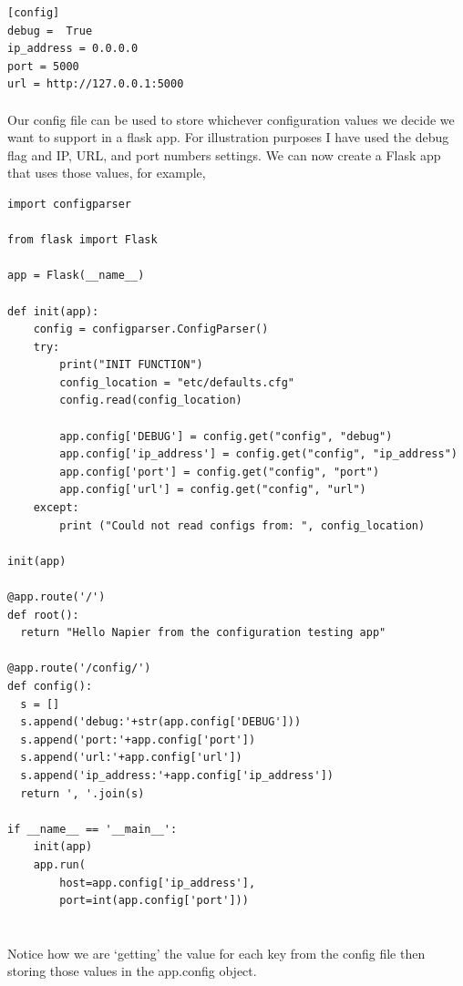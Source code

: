 \documentclass[12pt, a4paper, oneside]{book}
\begin{document}
{\begin{lstlisting}
[config]
debug =  True
ip_address = 0.0.0.0
port = 5000
url = http://127.0.0.1:5000
\end{lstlisting}

\paragraph{} Our config file can be used to store whichever configuration values we decide we want to support in a flask app. For illustration purposes I have used the debug flag and IP, URL, and port numbers settings. We can now create a Flask app that uses those values, for example,

\begin{lstlisting}
import configparser

from flask import Flask

app = Flask(__name__)

def init(app):
    config = configparser.ConfigParser()
    try:
        print("INIT FUNCTION")
        config_location = "etc/defaults.cfg"
        config.read(config_location)
        
        app.config['DEBUG'] = config.get("config", "debug")
        app.config['ip_address'] = config.get("config", "ip_address")
        app.config['port'] = config.get("config", "port")
        app.config['url'] = config.get("config", "url")
    except:
        print ("Could not read configs from: ", config_location)

init(app)

@app.route('/')
def root():
  return "Hello Napier from the configuration testing app"

@app.route('/config/')
def config():
  s = []
  s.append('debug:'+str(app.config['DEBUG']))
  s.append('port:'+app.config['port'])
  s.append('url:'+app.config['url'])
  s.append('ip_address:'+app.config['ip_address'])
  return ', '.join(s)

if __name__ == '__main__':
    init(app)
    app.run(
        host=app.config['ip_address'], 
        port=int(app.config['port']))


\end{lstlisting}

\paragraph{}  Notice how we are `getting' the value for each key from the config file then storing those values in the app.config object. 

}
\end{document}
